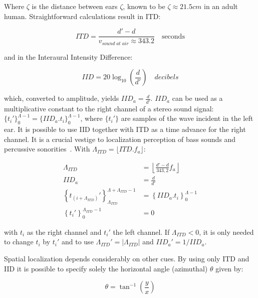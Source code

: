 Where $\zeta$ is the distance between ears $\zeta$, known to be $\zeta \approx 21.5cm$ in an adult human. Straightforward calculations result in ITD:

\begin{equation}\label{eq:dti}
ITD=\frac{d'-d}{v_{sound\;at\;air}\approx 343.2 }\quad \text{seconds}
\end{equation}

\noindent and in the Interaural Intensity Difference:

\begin{equation}\label{eq:dii}
IID=20\log_{10}\left (\frac{d}{d'}\right) \quad decibels
\end{equation}

\noindent which, converted to amplitude, yields $IID_a=\frac{d}{d'}$. $IID_a$ can be used as a multiplicative constant to the right channel of a stereo sound signal: $\{t_i'\}_0^{\Lambda -1}=\{IID_a . t_i\}_0^{\Lambda -1}$, where $\{t_i'\}$ are samples of the wave incident in the left ear. It is possible to use IID together with ITD as a time advance for the right channel. It is a crucial vestige to localization perception of bass sounds and percussive sonorities~\cite{Heeger}. 
With $\Lambda_{ITD}=\lfloor ITD . f_a \rfloor$:

\begin{equation}\label{eq:locImpl}
\begin{split}
\Lambda_{ITD} & = \left \lfloor \frac{d'-d}{343,2}  f_a \right \rfloor \\
IID_a & = \frac{d}{d'} \\
\left\{t_{(i+\Lambda_{ITD})}'\right\}_{\Lambda_{ITD}}^{\Lambda+\Lambda_{ITD}-1} & =\left\{IID_a . t_i\right\}_0^{\Lambda-1} \\
\left\{t_i'\right\}_0^{\Lambda_{ITD}-1} & = 0
\end{split}
\end{equation}

\noindent with $t_i$ as the right channel and $t_i'$ the left channel. If $\Lambda_{ITD} < 0 $, it is only needed to change $t_i$ by $t_i'$ and to use $\Lambda_{ITD}'= | \Lambda_{ITD} | $ and $IID_a'=1 / IID_a$.

Spatial localization depends considerably on other cues. By using only ITD and IID it is possible to specify solely the horizontal angle (azimuthal) $\theta$ given by:

\begin{equation}\label{eq:angulo}
\theta=\tan^{-1}\left ( \frac{y}{ x }  \right )
\end{equation}

